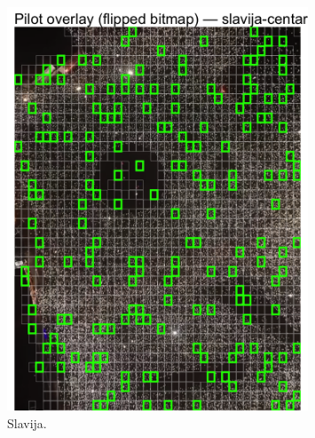 \documentclass[a4paper,12pt]{article}
\begin{document}
\begin{figure}[H] 
	\centering 
	\includegraphics[width=0.8\textwidth]{../outputs/sampling_outputs/main_overlays_image/main_overlay_slavija-centar.png} 
	\caption{Slavija.} 
	\label{fig:slavija} 
\end{figure}
\end{document}

